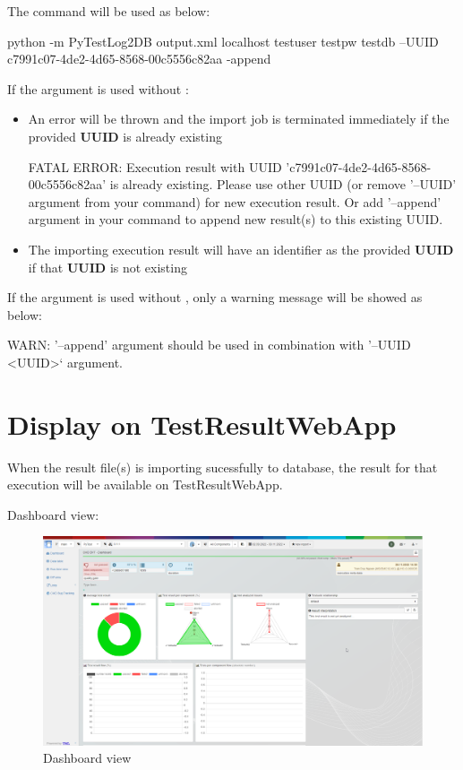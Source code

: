 The command will be used as below:

\begin{robotlog}
python -m PyTestLog2DB output.xml localhost testuser testpw testdb --UUID c7991c07-4de2-4d65-8568-00c5556c82aa -append
\end{robotlog}

If the argument  is used without :

\begin{itemize}
\item
  An error will be thrown and the import job is terminated immediately
  if the provided \textbf{UUID} is already existing

\begin{robotlog}
FATAL ERROR: Execution result with UUID 'c7991c07-4de2-4d65-8568-00c5556c82aa' is already existing.
             Please use other UUID (or remove '--UUID' argument from your command) for new execution result.
             Or add '--append' argument in your command to append new result(s) to this existing UUID.
\end{robotlog}
\item
  The importing execution result will have an identifier as the provided
  \textbf{UUID} if that \textbf{UUID} is not existing
\end{itemize}

If the argument  is used without , 
only a warning message will be showed as below:

\begin{robotlog}
WARN: '--append' argument should be used in combination with '--UUID <UUID>` argument.
\end{robotlog}

\newpage
\hypertarget{display-on-testresultwebapp}{%
\section{Display on
TestResultWebApp}\label{display-on-testresultwebapp}}

When the result file(s) is importing sucessfully to database, the result
for that execution will be available on TestResultWebApp.

Dashboard view:

\begin{figure}[h!]
  \includegraphics[width=1\linewidth]{./pictures/Dashboard.png}
  \caption{Dashboard view}
\end{figure}


